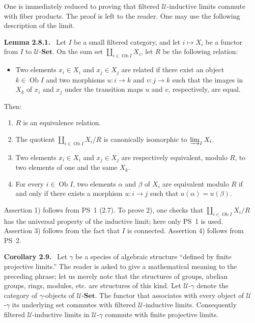 \documentclass[11pt]{article}
\newcommand{\U}{\mathcal{U}}
\newcommand{\Set}{\mathbf{Set}}
\newcommand{\Ob}{\operatorname{Ob}}
\newenvironment{statement}[1]{\par\medskip\noindent\textbf{#1.}\ }{\par\medskip}
\begin{document}
One is immediately reduced to proving that filtered $\U$-inductive limits commute with fiber products. The proof is left to the reader. One may use the following description of the limit.

\begin{statement}{Lemma 2.8.1}
Let $I$ be a small filtered category, and let $i\mapsto X_i$ be a functor from $I$ to $\U$-$\Set$. On the sum set $\coprod_{i\in\Ob I}X_i$, let $R$ be the following relation:
\begin{itemize}
\item[(R)] Two elements $x_i\in X_i$ and $x_j\in X_j$ are related if there exist an object $k\in\Ob I$ and two morphisms $u:i\to k$ and $v:j\to k$ such that the images in $X_k$ of $x_i$ and $x_j$ under the transition maps $u$ and $v$, respectively, are equal.
\end{itemize}
Then:
\begin{enumerate}[label=\arabic*)]
\item $R$ is an equivalence relation.
\item The quotient $\coprod_{i\in\Ob I}X_i/R$ is canonically isomorphic to $\varinjlim_I X_i$.
\item Two elements $x_i\in X_i$ and $x_j\in X_j$ are respectively equivalent, modulo $R$, to two elements of one and the same $X_k$.
\item For every $i\in\Ob I$, two elements $\alpha$ and $\beta$ of $X_i$ are equivalent modulo $R$ if and only if there exists a morphism $u:i\to j$ such that $u(\alpha)=u(\beta)$.
\end{enumerate}
\end{statement}

Assertion 1) follows from PS~1 (2.7). To prove 2), one checks that $\coprod_{i\in\Ob I}X_i/R$ has the universal property of the inductive limit; here only PS~1 is used. Assertion 3) follows from the fact that $I$ is connected. Assertion 4) follows from PS~2.

\begin{statement}{Corollary 2.9}
Let $\gamma$ be a species of algebraic structure ``defined by finite projective limits.'' The reader is asked to give a mathematical meaning to the preceding phrase; let us merely note that the structures of groups, abelian groups, rings, modules, etc. are structures of this kind. Let $\U$-$\gamma$ denote the category of $\gamma$-objects of $\U$-$\Set$. The functor that associates with every object of $\U$-$\gamma$ its underlying set commutes with filtered $\U$-inductive limits. Consequently filtered $\U$-inductive limits in $\U$-$\gamma$ commute with finite projective limits.
\end{statement}
\end{document}
